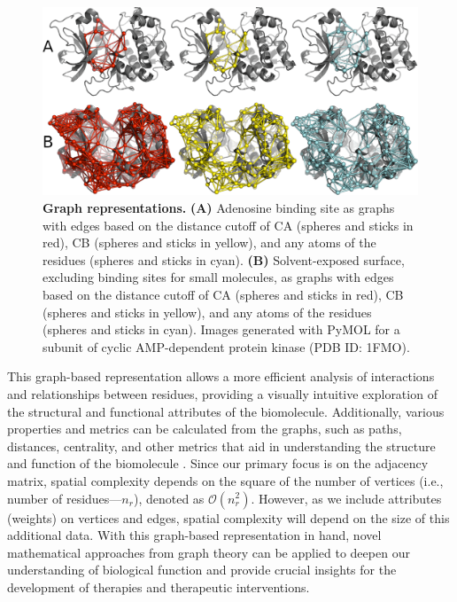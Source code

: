 \documentclass[Ingles]{phdthesis}
\def\ie{i.e.\onedot}
\begin{document}
\begin{figure}[H]
\centerline{\includegraphics[scale=1]{images/graph-representation.png}}
\caption[Graph representations]{\textbf{Graph representations.} \textbf{(A)} Adenosine binding site as graphs with edges based on the distance cutoff of \acs{CA} (spheres and sticks in red), \acs{CB} (spheres and sticks in yellow), and any atoms of the residues (spheres and sticks in cyan). \textbf{(B)} Solvent-exposed surface, excluding binding sites for small molecules, as graphs with edges based on the distance cutoff of \acs{CA} (spheres and sticks in red), \acs{CB} (spheres and sticks in yellow), and any atoms of the residues (spheres and sticks in cyan). Images generated with PyMOL for a subunit of cyclic AMP-dependent protein kinase (PDB ID: 1FMO).}
\label{fig:graph-representation}
\end{figure}

This graph-based representation allows a more efficient analysis of interactions and relationships between residues, providing a visually intuitive exploration of the structural and functional attributes of the biomolecule. Additionally, various properties and metrics can be calculated from the graphs, such as paths, distances, centrality, and other metrics that aid in understanding the structure and function of the biomolecule \cite{majeed2020,vishveshwara2002,mason2007}. Since our primary focus is on the adjacency matrix, spatial complexity depends on the square of the number of vertices (\ie, number of residues---$n_r$), denoted as $\mathcal{O}(n_{r}^{2})$. However, as we include attributes (weights) on vertices and edges, spatial complexity will depend on the size of this additional data. With this graph-based representation in hand, novel mathematical approaches from graph theory can be applied to deepen our understanding of biological function and provide crucial insights for the development of therapies and therapeutic interventions.
\end{document}
